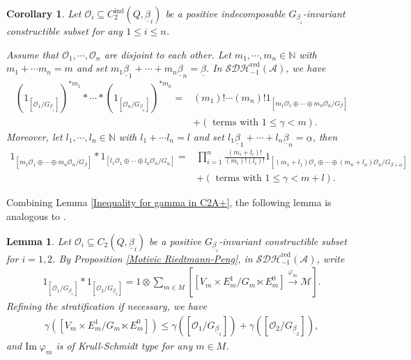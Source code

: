 \documentclass[12pt]{amsart}
\newtheorem{lemma}[theorem]{Lemma}
\newtheorem{corollary}[theorem]{Corollary}
\theoremstyle{definition}
\numberwithin{equation}{section}
\begin{document}
\begin{corollary}
    \label{Of Krull-Schmidt in C2A+}
    Let $ \mathcal{O}_i \subseteq C_2^{\mathrm{ind}}(Q,\underline{\beta}_i) $ be a positive indecomposable $ G_{\underline{\beta}_i}$-invariant constructible subset for any $ 1 \leqslant i \leqslant n  $. 
    
    Assume that $ \mathcal{O}_1,\cdots,\mathcal{O}_n $ are disjoint to each other. 
    Let $ m_1, \cdots, m_n \in \mathbb{N} $ with $ m_1 + \cdots m
    _n = m $ and set $ m_1 \underline{\beta}_1 + \cdots  + m_n \underline{\beta}_n  = \underline{\beta}$. 
    In $ \mathcal{SDH}_{-1}^{\mathrm{red}}(\mathcal{A}) $, we have 
    \begin{align*}
        (1_{[\mathcal{O}_1/G_{\underline{\beta}_1}]})^{*m_1} * \cdots * (1_{[\mathcal{O}_n/G_{\underline{\beta}_n}]})^{*{m_n}} =& (m_1)! \cdots (m_n)! 1_{[m_1 \mathcal{O}_1 \oplus \cdots \oplus m_n \mathcal{O}_n/G_{\underline{\beta}}]} \\
        &+ (\text{ terms with } 1 \leqslant \gamma < m) .
    \end{align*}
    Moreover, let $ l_1, \cdots, l_n \in \mathbb{N} $ with $ l_1 + \cdots l
    _n = l $ and set $ l_1 \underline{\beta}_1 + \cdots  + l_n \underline{\beta}_n  = \underline{\alpha}$, then 
    \begin{align*}
        1_{[m_1 \mathcal{O}_1 \oplus \cdots \oplus m_n \mathcal{O}_n/G_{\underline{\beta}}]} * 1_{[l_1 \mathcal{O}_1 \oplus \cdots \oplus l_n \mathcal{O}_n/G_{\underline{\alpha}}]} =& \prod_{i=1}^n\frac{(m_i+l_i)!}{(m_i)!(l_i)!} 1_{[(m_1+l_1) \mathcal{O}_1 \oplus \cdots \oplus (m_n+l_n) \mathcal{O}_n/G_{\underline{\beta}+\underline{\alpha}}]} \\
        &+  (\text{ terms with } 1 \leqslant \gamma < m+l). 
    \end{align*}
\end{corollary}

Combining Lemma \ref{Inequality for gamma in C2A+}, the following lemma is analogous to \cite[Proposition 11]{DXX10}.

\begin{lemma}
     \label{Of stratified Krull-Schmidt in C2A+}
     Let $ \mathcal{O}_i \subseteq  C_2(Q,\underline{\beta}_i) $ be a positive $ G_{\underline{\beta}_i} $-invariant constructible subset for $ i=1,2 $. 
     By Proposition \ref{Motivic Riedtmann-Peng}, in $ \mathcal{SDH}_{-1}^{\mathrm{red}}(\mathcal{A}) $, write
     \begin{align*}
        1_{[\mathcal{O}_1/G_{\underline{\beta}_1}]} * 1_{[\mathcal{O}_2/G_{\underline{\beta}_2}]} = 1 \otimes \sum_{m \in M} [[V_m \times E_m^1/G_m \ltimes E_m^0] \xrightarrow{\varphi_m} \mathcal{M}]. 
    \end{align*}
     Refining the stratification if necessary, we have
     \begin{align*}
         \gamma([V_m \times E_m^1/G_m \ltimes E_m^0]) \leqslant \gamma([\mathcal{O}_1/G_{\underline{\beta}_1}]) + \gamma([\mathcal{O}_2/G_{\underline{\beta}_2}]),
     \end{align*}
     and
     $ \mathrm{Im}\;\varphi_m $ is of Krull-Schmidt type for any $ m \in M $.
    
\end{lemma}
\end{document}

